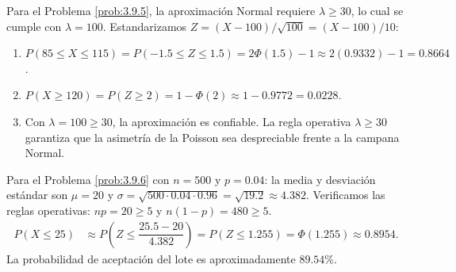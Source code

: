 \begin{solucion}
	\label{sol:3.9.5}
	Para el Problema \ref{prob:3.9.5}, la aproximación Normal requiere $\lambda \ge 30$, lo cual se cumple con $\lambda = 100$. Estandarizamos $Z = (X - 100)/\sqrt{100} = (X - 100)/10$:
	\begin{enumerate}
		\item $P(85 \le X \le 115) = P(-1.5 \le Z \le 1.5) = 2\Phi(1.5) - 1 \approx 2(0.9332) - 1 = 0.8664$.
		\item $P(X \ge 120) = P(Z \ge 2) = 1 - \Phi(2) \approx 1 - 0.9772 = 0.0228$.
		\item Con $\lambda = 100 \ge 30$, la aproximación es confiable. La regla operativa $\lambda \ge 30$ garantiza que la asimetría de la Poisson sea despreciable frente a la campana Normal.
	\end{enumerate}
\end{solucion}

\begin{solucion}
	\label{sol:3.9.6}
	Para el Problema \ref{prob:3.9.6} con $n = 500$ y $p = 0.04$: la media y desviación estándar son $\mu = 20$ y $\sigma = \sqrt{500 \cdot 0.04 \cdot 0.96} = \sqrt{19.2} \approx 4.382$. Verificamos las reglas operativas: $np = 20 \ge 5$ y $n(1-p) = 480 \ge 5$.
	\begin{align*}
		P(X \le 25) &\approx P\left(Z \le \dfrac{25.5 - 20}{4.382}\right) = P(Z \le 1.255) = \Phi(1.255) \approx 0.8954.
	\end{align*}
	La probabilidad de aceptación del lote es aproximadamente $89.54\%$.
\end{solucion}

